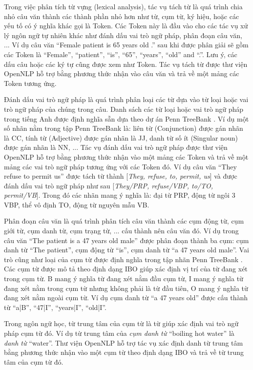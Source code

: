 Trong việc phân tích từ vựng (lexical analysis), tác vụ tách từ là quá trình chia nhỏ câu văn thành các thành phần nhỏ hơn như từ, cụm từ, ký hiệu, hoặc các yếu tố có ý nghĩa khác gọi là Token. Các Token này là đầu vào cho các tác vụ xử lý ngôn ngữ tự nhiên khác như đánh dấu vai trò ngữ pháp, phân đoạn câu văn, ... Ví dụ câu văn ``Female patient is 65 years old .'' sau khi được phân giải sẽ gồm các Token là ``Female'', ``patient'', ``is'', ``65'', ``years'', ``old'' and ``.''. Lưu ý, các dấu câu hoặc các ký tự cũng được xem như Token. Tác vụ tách từ được thư viện OpenNLP hỗ trợ bằng phương thức nhận vào câu văn và trả về một mảng các Token tương ứng.

Đánh dấu vai trò ngữ pháp là quá trình phân loại các từ dựa vào từ loại hoặc vai trò ngữ pháp của chúng trong câu. Danh sách các từ loại hoặc vai trò ngữ pháp trong tiếng Anh được định nghĩa sẵn dựa theo dự án Penn TreeBank \cite{Santorini1990}. Ví dụ một số nhãn nằm trong tập Penn TreeBank là: liên từ (Conjunction) được gán nhãn là CC, tính từ (Adjective) được gán nhãn là JJ, danh từ số ít (Singular noun) được gán nhãn là NN, ... Tác vụ đánh dấu vai trò ngữ pháp được thư viện OpenNLP hỗ trợ bằng phương thức nhận vào một mảng các Token và trả về một mảng các vai trò ngữ pháp tương ứng với các Token đó. Ví dụ câu văn ``They refuse to permit us'' được tách từ thành [\textit{They, refuse, to, permit, us}] và được đánh dấu vai trò ngữ pháp như sau [\textit{They/PRP, refuse/VBP, to/TO, permit/VB}]. Trong đó các nhãn mang ý nghĩa là: đại từ PRP, động từ ngôi 3 VBP, thể vô định TO, động từ nguyên mẫu VB.

Phân đoạn câu văn là quá trình phân tích câu văn thành các cụm động từ, cụm giới từ, cụm danh từ, cụm trạng từ, ... cấu thành nên câu văn đó. Ví dụ trong câu văn ``The patient is a 47 years old male'' được phân đoạn thành ba cụm: cụm danh từ ``The patient'', cụm động từ ``is'', cụm danh từ ``a 47 years old male''. Vai trò cũng như loại của cụm từ được định nghĩa trong tập nhãn Penn TreeBank \cite{Santorini1990}. Các cụm từ được mô tả theo định dạng IBO giúp xác định vị trí của từ  đang xét trong cụm từ. B mang ý nghĩa từ đang xét nằm đầu cụm từ, I mang ý nghĩa từ đang xét nằm trong cụm từ nhưng không phải là từ đầu tiên, O mang ý nghĩa từ đang xét nằm ngoài cụm từ. Ví dụ cụm danh từ ``a 47 years old'' được cấu thành từ ``a|B'', ``47|I'', ``years|I'', ``old|I''.

Trong ngôn ngữ học, từ trung tâm của cụm từ là từ giúp xác định vai trò ngữ pháp cụm từ đó. Ví dụ từ trung tâm của \textit{cụm danh từ} ``boiling hot water'' là \textit{danh từ} ``water''. Thư viện OpenNLP hỗ trợ tác vụ xác định danh từ trung tâm bằng phương thức nhận vào một cụm từ theo định dạng IBO và trả về từ trung tâm của cụm từ đó.

